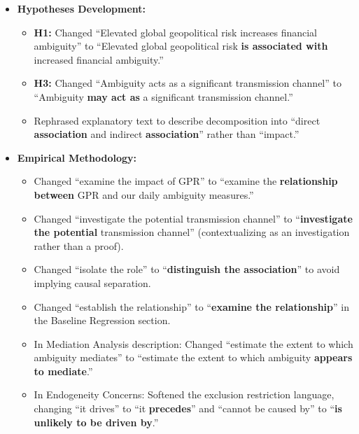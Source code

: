 \documentclass[12pt]{article}
\begin{document}
\begin{enumerate}
\begin{responsebox}
\begin{itemize}
        \item \textbf{Hypotheses Development:}
        \begin{itemize}
            \item \textbf{H1:} Changed ``Elevated global geopolitical risk increases financial ambiguity'' to ``Elevated global geopolitical risk \textbf{is associated with} increased financial ambiguity.''
            \item \textbf{H3:} Changed ``Ambiguity acts as a significant transmission channel'' to ``Ambiguity \textbf{may act as} a significant transmission channel.''
            \item Rephrased explanatory text to describe decomposition into ``direct \textbf{association} and indirect \textbf{association}'' rather than ``impact.''
        \end{itemize}

        \item \textbf{Empirical Methodology:}
        \begin{itemize}
            \item Changed ``examine the impact of GPR'' to ``examine the \textbf{relationship between} GPR and our daily ambiguity measures.''
            \item Changed ``investigate the potential transmission channel'' to ``\textbf{investigate the potential} transmission channel'' (contextualizing as an investigation rather than a proof).
            \item Changed ``isolate the role'' to ``\textbf{distinguish the association}'' to avoid implying causal separation.
            \item Changed ``establish the relationship'' to ``\textbf{examine the relationship}'' in the Baseline Regression section.
            \item In Mediation Analysis description: Changed ``estimate the extent to which ambiguity mediates'' to ``estimate the extent to which ambiguity \textbf{appears to mediate}.''
            \item In Endogeneity Concerns: Softened the exclusion restriction language, changing ``it drives'' to ``it \textbf{precedes}'' and ``cannot be caused by'' to ``\textbf{is unlikely to be driven by}.''
        \end{itemize}
        

\end{itemize}
\end{responsebox}
\end{enumerate}
\end{document}
